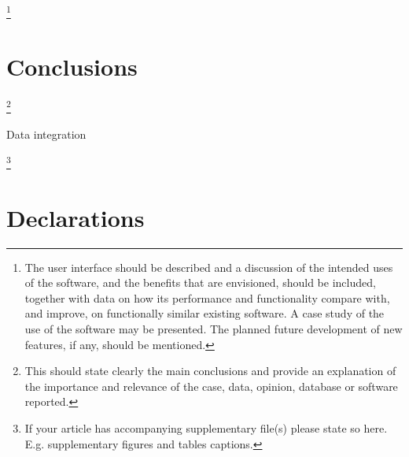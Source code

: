 \documentclass[sn-mathphys,Numbered, lineno]{sn-jnl}  %
\theoremstyle{thmstyleone}%
\theoremstyle{thmstyletwo}%
\theoremstyle{thmstylethree}%
\begin{document}
    \footnote{
        The user interface should be described and a discussion of the intended uses of the software, and the benefits that are envisioned, should be included, 
        together with data on how its performance and functionality compare with, and improve, on functionally similar existing software. 
        A case study of the use of the software may be presented. The planned future development of new features, if any, should be mentioned.
    }
    




\section{Conclusions}
\label{sec:conclusions}

    \footnote{
        This should state clearly the main conclusions and provide an explanation of the importance and relevance of the case, data, opinion, database or software reported.
    }

    Data integration 




\backmatter



    \label{supplementary-files}
    \footnote{
        If your article has accompanying supplementary file(s) please state so here.
        E.g. supplementary figures and tables captions. 
    }



\section*{Declarations}
\end{document}
